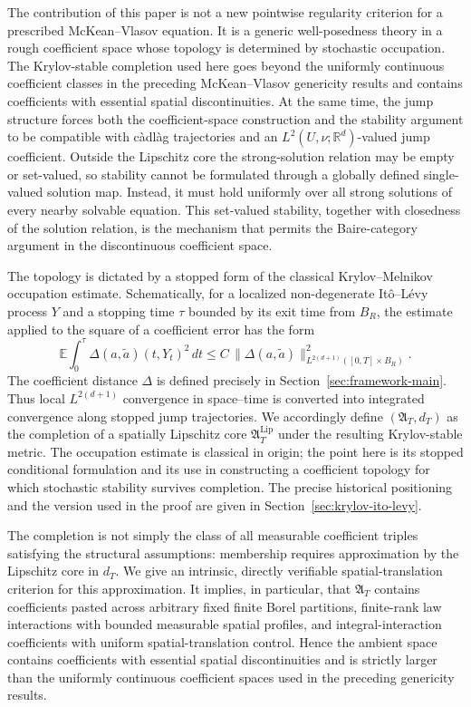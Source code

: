 \documentclass[12pt,oneside, reqno]{amsart}
\numberwithin{equation}{section}
\begin{document}
	The contribution of this paper is not a new pointwise regularity
	criterion for a prescribed McKean--Vlasov equation. It is a generic
	well-posedness theory in a rough coefficient space whose topology is
	determined by stochastic occupation. The Krylov-stable completion used
	here goes beyond the uniformly continuous coefficient classes in the
	preceding McKean--Vlasov genericity results and contains coefficients with
	essential spatial discontinuities. At the same time, the jump structure
	forces both the coefficient-space construction and the stability argument
	to be compatible with c\`adl\`ag trajectories and an
	$L^2(U,\nu;\mathbb R^d)$-valued jump coefficient. Outside the Lipschitz
	core the strong-solution relation may be empty or set-valued, so stability
	cannot be formulated through a globally defined single-valued solution
	map. Instead, it must hold uniformly over all strong solutions of every
	nearby solvable equation. This set-valued stability, together with
	closedness of the solution relation, is the mechanism that permits the
	Baire-category argument in the discontinuous coefficient space.
	
	The topology is dictated by a stopped form of the classical
	Krylov--Melnikov occupation estimate. Schematically, for a localized
	non-degenerate It\^o--L\'evy process $Y$ and a stopping time $\tau$
	bounded by its exit time from $B_R$, the estimate applied to the square
	of a coefficient error has the form
	\[
	\mathbb E\int_0^\tau
	\Delta(a,\widetilde a)(t,Y_t)^2\,dt
	\leq
	C\,\|\Delta(a,\widetilde a)\|_{L^{2(d+1)}([0,T]\times B_R)}^2.
	\]
	The coefficient distance $\Delta$ is defined precisely in
	Section~\ref{sec:framework-main}. Thus local $L^{2(d+1)}$ convergence in
	space--time is converted into integrated convergence along stopped jump
	trajectories. We accordingly define $(\mathfrak A_T,d_T)$ as the
	completion of a spatially Lipschitz core
	$\mathfrak A_T^{\mathrm{Lip}}$ under the resulting Krylov-stable metric.
	The occupation estimate is classical in origin; the point here is its
	stopped conditional formulation and its use in constructing a coefficient
	topology for which stochastic stability survives completion. The precise
	historical positioning and the version used in the proof are given in
	Section~\ref{sec:krylov-ito-levy}.
	
	The completion is not simply the class of all measurable coefficient
	triples satisfying the structural assumptions: membership requires
	approximation by the Lipschitz core in $d_T$. We give an intrinsic,
	directly verifiable spatial-translation criterion for this approximation.
	It implies, in particular, that $\mathfrak A_T$ contains coefficients
	pasted across arbitrary fixed finite Borel partitions, finite-rank law
	interactions with bounded measurable spatial profiles, and
	integral-interaction coefficients with uniform spatial-translation
	control. Hence the ambient space contains coefficients with essential
	spatial discontinuities and is strictly larger than the uniformly
	continuous coefficient spaces used in the preceding genericity results.
	
\end{document}
